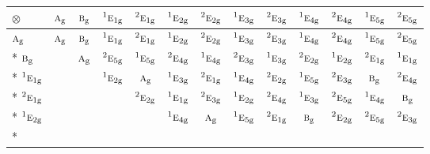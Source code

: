 \documentclass[10pt,a4paper]{article}
\numberwithin{equation}{section}
\newcommand{\irr}[1]{\text{\normalfont\scshape #1}}
\newcommand{\conjpair}[1]{{}^{#1}}
\newcommand{\ptag}[1]{\mathrm{#1}}
\newcommand{\irrprod}{\otimes}
\begin{document}
{\small\setlength{\tabcolsep}{3pt}\begin{longtable}{@{}lcccccccccccc@{}}\toprule
$\irrprod$ & $\irr{a}_{\ptag{g}}$ & $\irr{b}_{\ptag{g}}$ & $\conjpair{1}\irr{e}_{1\ptag{g}}$ & $\conjpair{2}\irr{e}_{1\ptag{g}}$ & $\conjpair{1}\irr{e}_{2\ptag{g}}$ & $\conjpair{2}\irr{e}_{2\ptag{g}}$ & $\conjpair{1}\irr{e}_{3\ptag{g}}$ & $\conjpair{2}\irr{e}_{3\ptag{g}}$ & $\conjpair{1}\irr{e}_{4\ptag{g}}$ & $\conjpair{2}\irr{e}_{4\ptag{g}}$ & $\conjpair{1}\irr{e}_{5\ptag{g}}$ & $\conjpair{2}\irr{e}_{5\ptag{g}}$\\\midrule\endhead
\bottomrule\endfoot\endlastfoot
$\irr{a}_{\ptag{g}}$ & $\irr{a}_{\ptag{g}}$ & $\irr{b}_{\ptag{g}}$ & $\conjpair{1}\irr{e}_{1\ptag{g}}$ & $\conjpair{2}\irr{e}_{1\ptag{g}}$ & $\conjpair{1}\irr{e}_{2\ptag{g}}$ & $\conjpair{2}\irr{e}_{2\ptag{g}}$ & $\conjpair{1}\irr{e}_{3\ptag{g}}$ & $\conjpair{2}\irr{e}_{3\ptag{g}}$ & $\conjpair{1}\irr{e}_{4\ptag{g}}$ & $\conjpair{2}\irr{e}_{4\ptag{g}}$ & $\conjpair{1}\irr{e}_{5\ptag{g}}$ & $\conjpair{2}\irr{e}_{5\ptag{g}}$\\*
$\irr{b}_{\ptag{g}}$ &  & $\irr{a}_{\ptag{g}}$ & $\conjpair{2}\irr{e}_{5\ptag{g}}$ & $\conjpair{1}\irr{e}_{5\ptag{g}}$ & $\conjpair{2}\irr{e}_{4\ptag{g}}$ & $\conjpair{1}\irr{e}_{4\ptag{g}}$ & $\conjpair{2}\irr{e}_{3\ptag{g}}$ & $\conjpair{1}\irr{e}_{3\ptag{g}}$ & $\conjpair{2}\irr{e}_{2\ptag{g}}$ & $\conjpair{1}\irr{e}_{2\ptag{g}}$ & $\conjpair{2}\irr{e}_{1\ptag{g}}$ & $\conjpair{1}\irr{e}_{1\ptag{g}}$\\*
$\conjpair{1}\irr{e}_{1\ptag{g}}$ &  &  & $\conjpair{1}\irr{e}_{2\ptag{g}}$ & $\irr{a}_{\ptag{g}}$ & $\conjpair{1}\irr{e}_{3\ptag{g}}$ & $\conjpair{2}\irr{e}_{1\ptag{g}}$ & $\conjpair{1}\irr{e}_{4\ptag{g}}$ & $\conjpair{2}\irr{e}_{2\ptag{g}}$ & $\conjpair{1}\irr{e}_{5\ptag{g}}$ & $\conjpair{2}\irr{e}_{3\ptag{g}}$ & $\irr{b}_{\ptag{g}}$ & $\conjpair{2}\irr{e}_{4\ptag{g}}$\\*
$\conjpair{2}\irr{e}_{1\ptag{g}}$ &  &  &  & $\conjpair{2}\irr{e}_{2\ptag{g}}$ & $\conjpair{1}\irr{e}_{1\ptag{g}}$ & $\conjpair{2}\irr{e}_{3\ptag{g}}$ & $\conjpair{1}\irr{e}_{2\ptag{g}}$ & $\conjpair{2}\irr{e}_{4\ptag{g}}$ & $\conjpair{1}\irr{e}_{3\ptag{g}}$ & $\conjpair{2}\irr{e}_{5\ptag{g}}$ & $\conjpair{1}\irr{e}_{4\ptag{g}}$ & $\irr{b}_{\ptag{g}}$\\*
$\conjpair{1}\irr{e}_{2\ptag{g}}$ &  &  &  &  & $\conjpair{1}\irr{e}_{4\ptag{g}}$ & $\irr{a}_{\ptag{g}}$ & $\conjpair{1}\irr{e}_{5\ptag{g}}$ & $\conjpair{2}\irr{e}_{1\ptag{g}}$ & $\irr{b}_{\ptag{g}}$ & $\conjpair{2}\irr{e}_{2\ptag{g}}$ & $\conjpair{2}\irr{e}_{5\ptag{g}}$ & $\conjpair{2}\irr{e}_{3\ptag{g}}$\\*

\end{longtable}}
\end{document}
